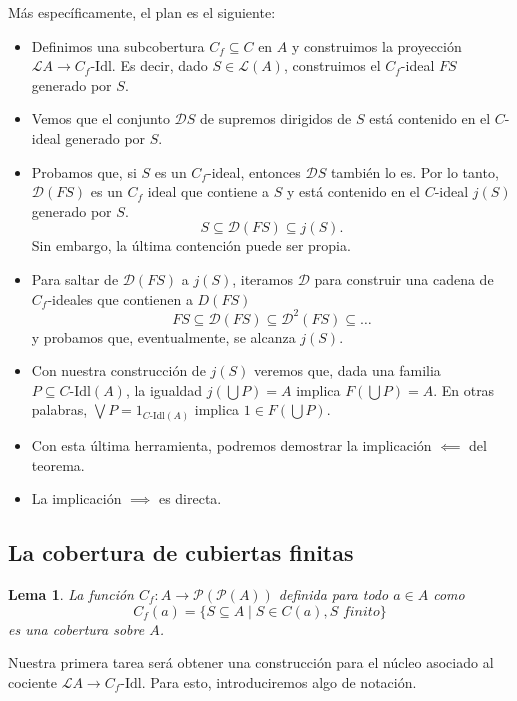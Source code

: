 \documentclass[12pt,letterpaper,titlepage]{article}
\newtheorem*{lemma}{Lema}
\theoremstyle{definition}
\newcommand\Sup{\bigvee}
\renewcommand\cal[1]{\mathcal{#1}}
\newcommand\<{\langle}
\renewcommand\>{\rangle}
\newcommand\Idl{\text{-}\mathrm{Idl}}
\begin{document}
Más específicamente, el plan es el siguiente:
\begin{itemize}
    \item
    Definimos una subcobertura $C_f\subseteq C$ en $A$ y
    construimos la proyección $\cal LA\to C_f\Idl$.
    Es decir, dado $S\in\cal L(A)$,
    construimos el $C_f$-ideal $FS$ generado por $S$.
    \item 
    Vemos que el conjunto $\cal DS$ de supremos dirigidos
    de $S$ está contenido en el $C$-ideal generado por $S$.
    \item
    Probamos que, si $S$ es un $C_f$-ideal, entonces
    $\cal DS$ también lo es.
    Por lo tanto, $\cal D(FS)$ es un $C_f$ ideal que
    contiene a $S$ y está contenido en el $C$-ideal $j(S)$
    generado por $S$.
    \[
        S\subseteq \cal D(FS) \subseteq j(S)
    .\]
    Sin embargo, la última contención puede ser propia.
    \item
    Para saltar de $\cal D(FS)$ a $j(S)$,
    iteramos $\cal D$ para construir una
    cadena de $C_f$-ideales que contienen a $D(FS)$
    \[
        FS\subseteq \cal D(FS) \subseteq \cal D^2(FS)
        \subseteq \dots
    \]
    y probamos que, eventualmente, se alcanza $j(S)$.
    \item
    Con nuestra construcción de $j(S)$ veremos
    que, dada una familia $P\subseteq C\Idl(A)$,
    la igualdad
    $j(\bigcup P)=A$ implica $F(\bigcup P)=A$.
    En otras palabras,
    $\Sup P = 1_{C\Idl(A)}$ implica $1\in F(\bigcup P)$.
    \item
    Con esta última herramienta, podremos demostrar
    la implicación $\impliedby$ del teorema.
    \item
    La implicación $\implies$ es directa.
\end{itemize}

\subsection{La cobertura de cubiertas finitas}

\begin{lemma}
La función $C_f:A\to\cal P(\cal P(A))$
definida para todo $a\in A$ como
\[C_f(a)=\{S\subseteq A\mid S\in C(a), S\textit{ finito}\}\]
es una cobertura sobre $A$.
\end{lemma}

Nuestra primera tarea será obtener una construcción para
el núcleo asociado al cociente $\cal LA\to C_f\Idl$.
Para esto, introduciremos algo de notación.
\end{document}
